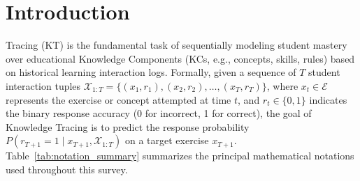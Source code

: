 ﻿\documentclass[10pt,journal,compsoc]{IEEEtran}
\begin{document}
\maketitle
\IEEEdisplaynontitleabstractindextext
\IEEEpeerreviewmaketitle

\section{Introduction}
 Tracing (KT) is the fundamental task of sequentially modeling student mastery over educational Knowledge Components (KCs, e.g., concepts, skills, rules) based on historical learning interaction logs. Formally, given a sequence of $T$ student interaction tuples $\mathcal{X}_{1:T} = \{(x_1, r_1), (x_2, r_2), \dots, (x_T, r_T)\}$, where $x_t \in \mathcal{E}$ represents the exercise or concept attempted at time $t$, and $r_t \in \{0, 1\}$ indicates the binary response accuracy (0 for incorrect, 1 for correct), the goal of Knowledge Tracing is to predict the response probability $P(r_{T+1} = 1 \mid x_{T+1}, \mathcal{X}_{1:T})$ on a target exercise $x_{T+1}$. Table~\ref{tab:notation_summary} summarizes the principal mathematical notations used throughout this survey.

\begin{table}[t]
\caption{Summary of Key Mathematical Notations}
\label{tab:notation_summary}
\centering
{}
\end{table}
\end{document}
